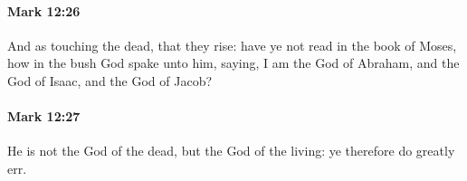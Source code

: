 		\paragraph{Mark 12:26} %
			\label{MARK-12-26}

			And as touching the dead, that they rise: have ye not read in the book of Moses, how in the bush God spake unto him, saying, I am the God of Abraham, and the God of Isaac, and the God of Jacob?

			\begin{framed}
			\scriptsize
				\begin{compactdesc}
					\item[SBLG] 
				\end{compactdesc}
			\end{framed}

		\paragraph{Mark 12:27} %
			\label{MARK-12-27}

			He is not the God of the dead, but the God of the living: ye therefore do greatly err.

